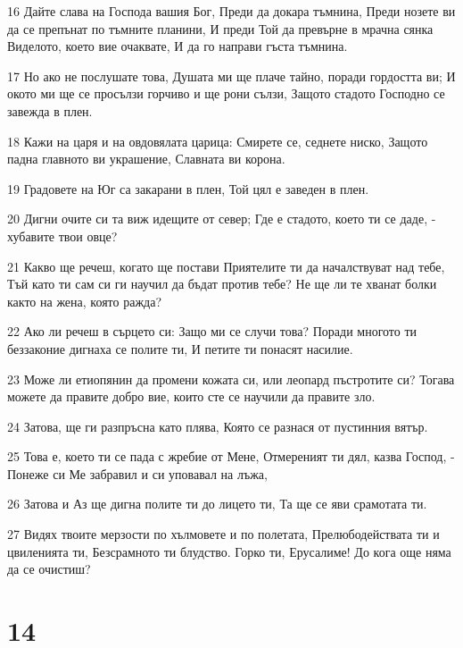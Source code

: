 \par 16 Дайте слава на Господа вашия Бог, Преди да докара тъмнина, Преди нозете ви да се препънат по тъмните планини, И преди Той да превърне в мрачна сянка Виделото, което вие очаквате, И да го направи гъста тъмнина.
\par 17 Но ако не послушате това, Душата ми ще плаче тайно, поради гордостта ви; И окото ми ще се просълзи горчиво и ще рони сълзи, Защото стадото Господно се завежда в плен.
\par 18 Кажи на царя и на овдовялата царица: Смирете се, седнете ниско, Защото падна главното ви украшение, Славната ви корона.
\par 19 Градовете на Юг са закарани в плен, Той цял е заведен в плен.
\par 20 Дигни очите си та виж идещите от север; Где е стадото, което ти се даде, - хубавите твои овце?
\par 21 Какво ще речеш, когато ще постави Приятелите ти да началствуват над тебе, Тъй като ти сам си ги научил да бъдат против тебе? Не ще ли те хванат болки както на жена, която ражда?
\par 22 Ако ли речеш в сърцето си: Защо ми се случи това? Поради многото ти беззаконие дигнаха се полите ти, И петите ти понасят насилие.
\par 23 Може ли етиопянин да промени кожата си, или леопард пъстротите си? Тогава можете да правите добро вие, които сте се научили да правите зло.
\par 24 Затова, ще ги разпръсна като плява, Която се разнася от пустинния вятър.
\par 25 Това е, което ти се пада с жребие от Мене, Отмереният ти дял, казва Господ, - Понеже си Ме забравил и си уповавал на лъжа,
\par 26 Затова и Аз ще дигна полите ти до лицето ти, Та ще се яви срамотата ти.
\par 27 Видях твоите мерзости по хълмовете и по полетата, Прелюбодействата ти и цвиленията ти, Безсрамното ти блудство. Горко ти, Ерусалиме! До кога още няма да се очистиш?

\chapter{14}

